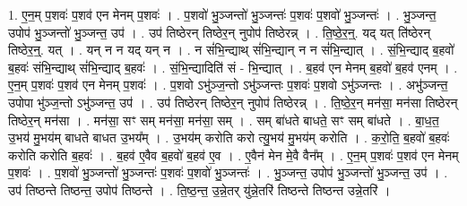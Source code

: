 \documentclass[17pt]{extarticle}
\begin{document}
1. ए॒न॒म् प॒शवः॑ प॒शव॑ एन मेनम् प॒शवः॑ । . प॒शवो॑ भु॒ञ्जन्तो॑ भु॒ञ्जन्तः॑ प॒शवः॑ प॒शवो॑ भु॒ञ्जन्तः॑ । . भु॒ञ्जन्त॒ उपोप॑ भु॒ञ्जन्तो॑ भु॒ञ्जन्त॒ उप॑ । . उप॑ तिष्ठेरन् तिष्ठेर॒न् नुपोप॑ तिष्ठेरन्न् । . ति॒ष्ठे॒र॒न्॒. यद् यत् ति॑ष्ठेरन् तिष्ठेर॒न्॒. यत् । . यन् न न यद् यन् न । . न सं॑भि॒न्द्याथ् सं॑भि॒न्द्यान् न न सं॑भि॒न्द्यात् । . सं॒भि॒न्द्याद् ब॒हवो॑ ब॒हवः॑ संभि॒न्द्याथ् सं॑भि॒न्द्याद् ब॒हवः॑ । . सं॒भि॒न्द्यादिति॑ सं - भि॒न्द्यात् । . ब॒हव॑ एन मेनम् ब॒हवो॑ ब॒हव॑ एनम् । . ए॒न॒म् प॒शवः॑ प॒शव॑ एन मेनम् प॒शवः॑ । . प॒शवो ऽभु॑ञ्ज॒न्तो ऽभु॑ञ्जन्तः प॒शवः॑ प॒शवो ऽभु॑ञ्जन्तः । . अभु॑ञ्जन्त॒ उपोपा भु॑ञ्ज॒न्तो ऽभु॑ञ्जन्त॒ उप॑ । . उप॑ तिष्ठेरन् तिष्ठेर॒न् नुपोप॑ तिष्ठेरन्न् । . ति॒ष्ठे॒र॒न् मन॑सा॒ मन॑सा तिष्ठेरन् तिष्ठेर॒न् मन॑सा । . मन॑सा॒ सꣳ सम् मन॑सा॒ मन॑सा॒ सम् । . सम् बा॑धते बाधते॒ सꣳ सम् बा॑धते । . बा॒ध॒त॒ उ॒भय॑ मु॒भय॑म् बाधते बाधत उ॒भय᳚म् । . उ॒भय॑म् करोति करो त्यु॒भय॑ मु॒भय॑म् करोति । . क॒रो॒ति॒ ब॒हवो॑ ब॒हवः॑ करोति करोति ब॒हवः॑ । . ब॒हव॑ ए॒वैव ब॒हवो॑ ब॒हव॑ ए॒व । . ए॒वैन॑ मेन मे॒वै वैन᳚म् । . ए॒न॒म् प॒शवः॑ प॒शव॑ एन मेनम् प॒शवः॑ । . प॒शवो॑ भु॒ञ्जन्तो॑ भु॒ञ्जन्तः॑ प॒शवः॑ प॒शवो॑ भु॒ञ्जन्तः॑ । . भु॒ञ्जन्त॒ उपोप॑ भु॒ञ्जन्तो॑ भु॒ञ्जन्त॒ उप॑ । . उप॑ तिष्ठन्ते तिष्ठन्त॒ उपोप॑ तिष्ठन्ते । . ति॒ष्ठ॒न्त॒ उ॒न्ने॒तर् यु॑न्ने॒तरि॑ तिष्ठन्ते तिष्ठन्त उन्ने॒तरि॑ । \newline
\end{document}

